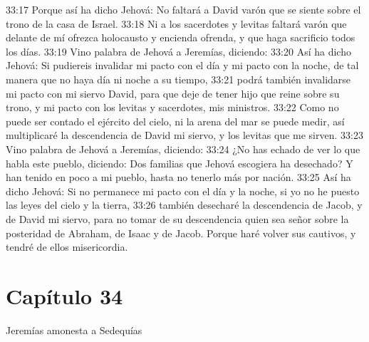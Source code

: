 33:17 Porque así ha dicho Jehová: No faltará a David varón que se siente sobre el trono de la casa de Israel. 
33:18 Ni a los sacerdotes y levitas faltará varón que delante de mí ofrezca holocausto y encienda ofrenda, y que haga sacrificio todos los días. 
33:19 Vino palabra de Jehová a Jeremías, diciendo: 
33:20 Así ha dicho Jehová: Si pudiereis invalidar mi pacto con el día y mi pacto con la noche, de tal manera que no haya día ni noche a su tiempo, 
33:21 podrá también invalidarse mi pacto con mi siervo David, para que deje de tener hijo que reine sobre su trono, y mi pacto con los levitas y sacerdotes, mis ministros. 
33:22 Como no puede ser contado el ejército del cielo, ni la arena del mar se puede medir, así multiplicaré la descendencia de David mi siervo, y los levitas que me sirven. 
33:23 Vino palabra de Jehová a Jeremías, diciendo: 
33:24 ¿No has echado de ver lo que habla este pueblo, diciendo: Dos familias que Jehová escogiera ha desechado? Y han tenido en poco a mi pueblo, hasta no tenerlo más por nación. 
33:25 Así ha dicho Jehová: Si no permanece mi pacto con el día y la noche, si yo no he puesto las leyes del cielo y la tierra, 
33:26 también desecharé la descendencia de Jacob, y de David mi siervo, para no tomar de su descendencia quien sea señor sobre la posteridad de Abraham, de Isaac y de Jacob. Porque haré volver sus cautivos, y tendré de ellos misericordia. 
\section*{Capítulo 34 }
Jeremías amonesta a Sedequías 
 
